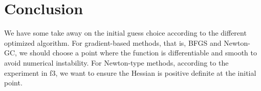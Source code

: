 \documentclass[12pt]{article}
\begin{document}

\section{Conclusion}

We have some take away on the initial guess choice according to the different optimized algorithm. For gradient-based methods, that is, BFGS and Newton-GC, we should choose a point where the function is differentiable and smooth to avoid numerical instability. For Newton-type methods, according to the experiment in f3, we want to ensure the Hessian is positive definite at the initial point. 

\end{document}
